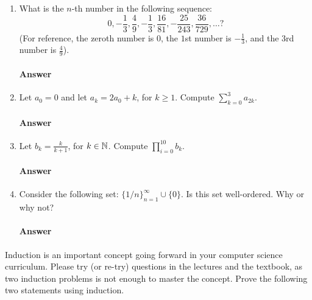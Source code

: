 \begin{enumerate}

    \item What is the $n$-th number in the following sequence:
        $$
            0, -\frac{1}{3}, \frac{4}{9}, -\frac{1}{3}, \frac{16}{81},
            -\frac{25}{243}, \frac{36}{729}, \ldots?
        $$
        (For reference,
        the zeroth number is $0$, the $1$st number is $-\frac{1}{3}$, and the $3$rd
        number is $\frac{4}{9}$).
        \paragraph{Answer}
        \todo{}

    \item Let $a_0=0$ and let $a_k=2a_0+k$, for $k\geq 1$.
        Compute $\sum_{k=0}^3 a_{2k}$.
        \paragraph{Answer}
        \todo{}

    \item Let $b_k=\frac{k}{k+1}$, for $k\in {\mathbb N}$.
        Compute  $\prod_{i=0}^{10} b_{k}$.
        \paragraph{Answer}
        \todo{}

    \item Consider the following set: $\{ 1/n\}_{n=1}^{\infty} \cup \{ 0 \}$.
        Is this set well-ordered. Why or why not?
        \paragraph{Answer}
        \todo{}



\end{enumerate}

\collab{\todo{}}

Induction is an important concept going forward in your computer science
curriculum.  Please try (or re-try) questions in the lectures and the textbook,
as two induction problems is not enough to master the concept.  Prove the
following two statements using induction.

